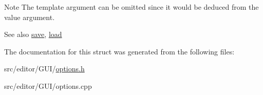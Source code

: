 \begin{DoxyNote}{\-Note}
\-The template argument can be omitted since it would be deduced from the value argument.
\end{DoxyNote}
\begin{DoxySeeAlso}{\-See also}
\hyperlink{struct_options_ad20146ff9544f6229bb1696ea5bf643d}{save}, \hyperlink{struct_options_ada32d485296bd6ba73a1d95bd6260c1a}{load} 
\end{DoxySeeAlso}


\-The documentation for this struct was generated from the following files\-:\begin{DoxyCompactItemize}
\item 
src/editor/\-G\-U\-I/\hyperlink{options_8h}{options.\-h}\item 
src/editor/\-G\-U\-I/options.\-cpp\end{DoxyCompactItemize}
